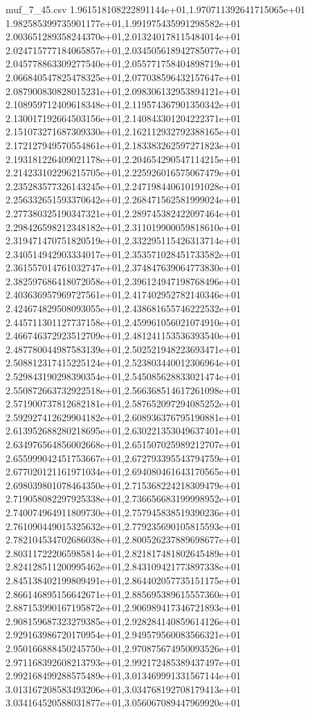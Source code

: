 \begin{filecontents*}{muf_7_45.csv}
1.961518108222891144e+01,1.970711392641715065e+01
1.982585399735901177e+01,1.991975435991298582e+01
2.003651289358244370e+01,2.013240178115484014e+01
2.024715777184065857e+01,2.034505618942785077e+01
2.045778863309277540e+01,2.055771758404898719e+01
2.066840547825478325e+01,2.077038596432157647e+01
2.087900830828015231e+01,2.098306132953894121e+01
2.108959712409618348e+01,2.119574367901350342e+01
2.130017192664503156e+01,2.140843301204222371e+01
2.151073271687309330e+01,2.162112932792388165e+01
2.172127949570554861e+01,2.183383262597271823e+01
2.193181226409021178e+01,2.204654290547114215e+01
2.214233102296215705e+01,2.225926016575067479e+01
2.235283577326143245e+01,2.247198440610191028e+01
2.256332651593370642e+01,2.268471562581999024e+01
2.277380325190347321e+01,2.289745382422097464e+01
2.298426598212348182e+01,2.311019900059818610e+01
2.319471470751820519e+01,2.332295115426313714e+01
2.340514942903334017e+01,2.353571028451733582e+01
2.361557014761032747e+01,2.374847639064773830e+01
2.382597686418072058e+01,2.396124947198768496e+01
2.403636957969727561e+01,2.417402952782140346e+01
2.424674829508093055e+01,2.438681655746222532e+01
2.445711301127737158e+01,2.459961056021074910e+01
2.466746372923512709e+01,2.481241153536393540e+01
2.487780044987583139e+01,2.502521948223693471e+01
2.508812317415225124e+01,2.523803440012306964e+01
2.529843190298390354e+01,2.545085628833021474e+01
2.550872663732922518e+01,2.566368514617261098e+01
2.571900737812682181e+01,2.587652097294085252e+01
2.592927412629904182e+01,2.608936376795190881e+01
2.613952688280218695e+01,2.630221353049637401e+01
2.634976564856002668e+01,2.651507025989212707e+01
2.655999042451753667e+01,2.672793395543794759e+01
2.677020121161971034e+01,2.694080461643170565e+01
2.698039801078464350e+01,2.715368224218309479e+01
2.719058082297925338e+01,2.736656683199998952e+01
2.740074964911809730e+01,2.757945838519390236e+01
2.761090449015325632e+01,2.779235690105815593e+01
2.782104534702686038e+01,2.800526237889698677e+01
2.803117222065985814e+01,2.821817481802645489e+01
2.824128511200995462e+01,2.843109421773897338e+01
2.845138402199809491e+01,2.864402057735151175e+01
2.866146895156642671e+01,2.885695389615557360e+01
2.887153990167195872e+01,2.906989417346721893e+01
2.908159687323279385e+01,2.928284140859614126e+01
2.929163986720170954e+01,2.949579560083566321e+01
2.950166888450245750e+01,2.970875674950093526e+01
2.971168392608213793e+01,2.992172485389437497e+01
2.992168499288575489e+01,3.013469991331567144e+01
3.013167208583493206e+01,3.034768192708179413e+01
3.034164520588031877e+01,3.056067089447969920e+01

\end{filecontents*}
